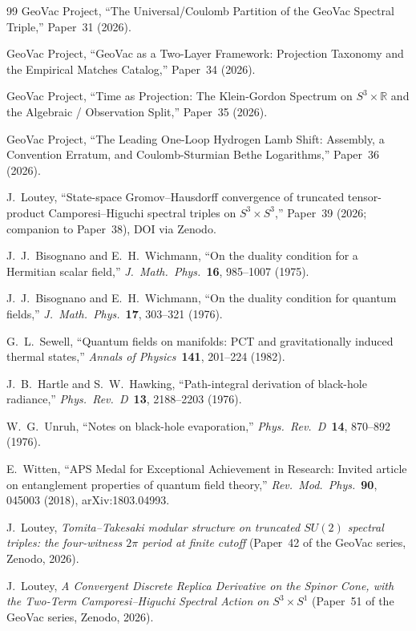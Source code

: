 \documentclass[11pt]{article}
\begin{document}
\begin{thebibliography}{99}
GeoVac Project, ``The Universal/Coulomb Partition of the GeoVac
Spectral Triple,'' Paper~31 (2026).

GeoVac Project, ``GeoVac as a Two-Layer Framework: Projection Taxonomy
and the Empirical Matches Catalog,'' Paper~34 (2026).

GeoVac Project, ``Time as Projection: The Klein-Gordon Spectrum on
$S^3 \times \mathbb{R}$ and the Algebraic / Observation Split,''
Paper~35 (2026).

GeoVac Project, ``The Leading One-Loop Hydrogen Lamb Shift: Assembly,
a Convention Erratum, and Coulomb-Sturmian Bethe Logarithms,'' Paper~36
(2026).

J.~Loutey, ``State-space Gromov--Hausdorff convergence of truncated
tensor-product Camporesi--Higuchi spectral triples on $S^3 \times S^3$,''
Paper~39 (2026; companion to Paper~38), DOI via Zenodo.

J.~J.~Bisognano and E.~H.~Wichmann,
``On the duality condition for a Hermitian scalar field,''
\textit{J.~Math.~Phys.}\ \textbf{16}, 985--1007 (1975).

J.~J.~Bisognano and E.~H.~Wichmann,
``On the duality condition for quantum fields,''
\textit{J.~Math.~Phys.}\ \textbf{17}, 303--321 (1976).

G.~L.~Sewell,
``Quantum fields on manifolds: PCT and gravitationally induced thermal
states,''
\textit{Annals of Physics}\ \textbf{141}, 201--224 (1982).

J.~B.~Hartle and S.~W.~Hawking,
``Path-integral derivation of black-hole radiance,''
\textit{Phys.~Rev.~D}\ \textbf{13}, 2188--2203 (1976).

W.~G.~Unruh,
``Notes on black-hole evaporation,''
\textit{Phys.~Rev.~D}\ \textbf{14}, 870--892 (1976).

E.~Witten,
``APS Medal for Exceptional Achievement in Research: Invited article on
entanglement properties of quantum field theory,''
\textit{Rev.~Mod.~Phys.}\ \textbf{90}, 045003 (2018), arXiv:1803.04993.

J.~Loutey, \emph{Tomita--Takesaki modular structure on truncated $SU(2)$
spectral triples: the four-witness $2\pi$ period at
finite cutoff} (Paper~42 of the GeoVac series, Zenodo, 2026).

J.~Loutey, \emph{A Convergent Discrete Replica Derivative on the Spinor
Cone, with the Two-Term Camporesi--Higuchi Spectral Action on
$S^3 \times S^1$} (Paper~51 of the GeoVac series, Zenodo, 2026).


\end{thebibliography}
\end{document}

